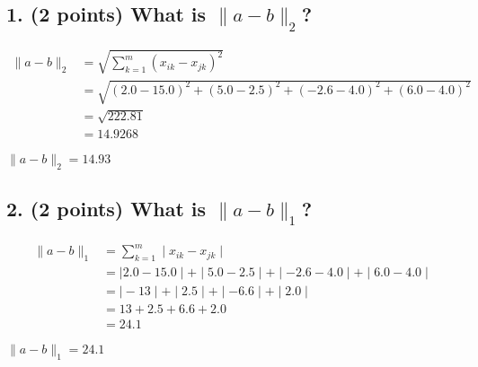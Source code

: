 \documentclass[11pt]{article}
\begin{document}
\subsection*{\textbf{1. (2 points)} What is $\|a-b\|_2$?}


\begin{align*}
    \|a-b\|_2 &= \sqrt{ \sum_{k=1}^{m} ( x_{ik} - x_{jk} )^{2} } \\
    & = \sqrt{ ( 2.0 - 15.0 )^{2} + ( 5.0 - 2.5 )^{2} + ( -2.6 - 4.0 )^{2} + ( 6.0 - 4.0 )^{2} } \\
    & = \sqrt{ 222.81 } \\
    & = 14.9268
\end{align*}

\begin{tcolorbox}[title=Problem 3.1]
    $\|a-b\|_2 = 14.93$
\end{tcolorbox}


\subsection*{\textbf{2. (2 points)} What is $\|a-b\|_1$?}


\begin{align*}
    \|a-b\|_1 &= \sum_{k=1}^{m}  \mid x_{ik} - x_{jk} \mid  \\
    &= \mid 2.0 - 15.0 \mid + \mid 5.0 - 2.5 \mid + \mid -2.6 - 4.0 \mid + \mid 6.0 - 4.0 \mid \\
    &= \mid -13 \mid + \mid 2.5 \mid + \mid -6.6 \mid + \mid 2.0 \mid \\
    &= 13 + 2.5 + 6.6 + 2.0 \\
    &= 24.1
\end{align*}

\begin{tcolorbox}[title=Problem 3.2]
    $\|a-b\|_1 = 24.1$
\end{tcolorbox}
\end{document}
